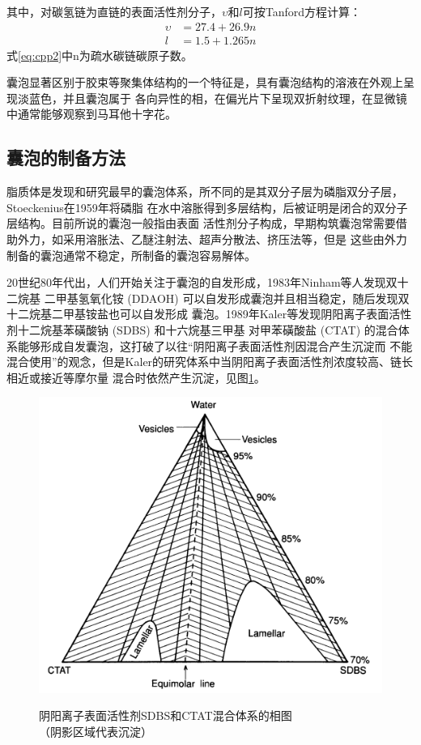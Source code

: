 \documentclass[bachelor,fandolfonts,replaceperiod]{jnuthesis}
\begin{document}
    其中，对碳氢链为直链的表面活性剂分子，$\upsilon$和$l$可按Tanford方程计算：
    \begin{align}\label{eq:cpp2}
        \upsilon &= 27.4+26.9n\\
        l &= 1.5+1.265n
    \end{align}
    式\ref{eq:cpp2}中n为疏水碳链碳原子数。
    
    囊泡显著区别于胶束等聚集体结构的一个特征是，具有囊泡结构的溶液在外观上呈现淡蓝色，并且囊泡属于
    各向异性的相，在偏光片下呈现双折射纹理，在显微镜中通常能够观察到马耳他十字花\cite{刘洪国2016}。
        
    \subsection{囊泡的制备方法}
    脂质体是发现和研究最早的囊泡体系，所不同的是其双分子层为磷脂双分子层，Stoeckenius在1959年将磷脂
    在水中溶胀得到多层结构\cite{刘洪国2016}，后被证明是闭合的双分子层结构。目前所说的囊泡一般指由表面
    活性剂分子构成，早期构筑囊泡常需要借助外力，如采用溶胀法、乙醚注射法、超声分散法、挤压法等，但是
    这些由外力制备的囊泡通常不稳定，所制备的囊泡容易解体\cite{刘洪国2016}。
    
    20世纪80年代出，人们开始关注于囊泡的自发形成，1983年Ninham等人\cite{ninham1983}发现双十二烷基
    二甲基氢氧化铵 (DDAOH) 可以自发形成囊泡并且相当稳定，随后发现双十二烷基二甲基铵盐也可以自发形成
    囊泡。1989年Kaler等\cite{kaler1989}发现阴阳离子表面活性剂十二烷基苯磺酸钠 (SDBS) 和十六烷基三甲基
    对甲苯磺酸盐 (CTAT) 的混合体系能够形成自发囊泡，这打破了以往“阴阳离子表面活性剂因混合产生沉淀而
    不能混合使用”的观念，但是Kaler的研究体系中当阴阳离子表面活性剂浓度较高、链长相近或接近等摩尔量
    混合时依然产生沉淀，见图\ref{fig:vesicle-phase}。    
    \begin{figure}[htbp]
        \centering
        \includegraphics[width= .526\textwidth]{figure/vesicle-phase.png}\\
        \caption{阴阳离子表面活性剂SDBS和CTAT混合体系的相图\cite{kaler1989}\\{\footnotesize{（阴影区域代表沉淀）}}}
        \label{fig:vesicle-phase}
    \end{figure}
\end{document}
